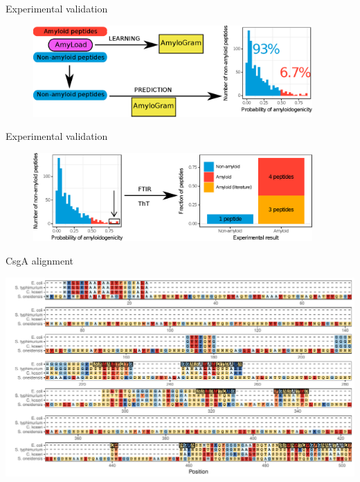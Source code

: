 \documentclass{beamer}\usepackage[]{graphicx}\usepackage[]{color}
\makeatletter
\def\maxwidth{ %
  \ifdim\Gin@nat@width>\linewidth
    \linewidth
  \else
    \Gin@nat@width
  \fi
}
\newenvironment{knitrout}{}{} %
\makeatother
\begin{document}
\begin{frame}{Experimental validation}
\begin{figure} 
\includegraphics[width=0.95\textwidth]{static_figure/diagram1.eps}
\end{figure}
\end{frame}

\begin{frame}{Experimental validation}
\begin{figure} 
\includegraphics[width=0.95\textwidth]{static_figure/diagram2.eps}
\end{figure}
\end{frame}


\begin{frame}{CsgA alignment}

\begin{knitrout}
\color{fgcolor}

{\centering \includegraphics[width=\maxwidth]{figure/unnamed-chunk-20-1} 

}



\end{knitrout}

\end{frame}
\end{document}
